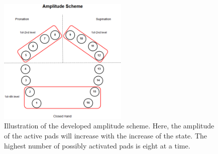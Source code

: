 \begin{figure}[H]                 
	\includegraphics[width=0.55\textwidth]{figures/El_array_amplitude}  
	\caption{Illustration of the developed amplitude scheme. Here, the amplitude of the active pads will increase with the increase of the state. The highest number of possibly activated pads is eight at a time.}
	\label{fig:amplitude} 
\end{figure}






